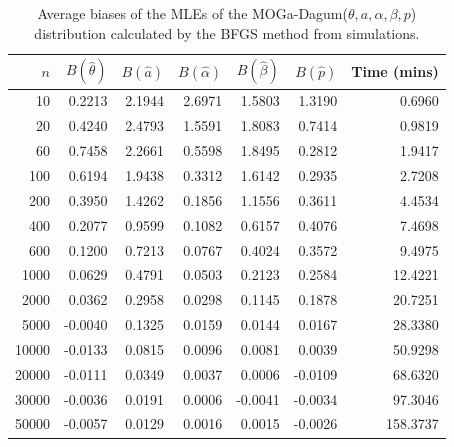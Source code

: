 \documentclass[twoside,leqno,11pt]{article}
\begin{document}
\begin{table}[H]
\centering
\caption{Average biases of the MLEs of the MOGa-Dagum($\theta, a, \alpha, \beta, p$) distri\-bu\-tion 
calculated by the BFGS method from simulations.}\label{tab:bias1}
	\begin{tabular}{rrrrrrr}
		\hline
		$n$ & $B(\hat{\theta})$ & $B(\hat{a})$ & $B(\hat{\alpha})$ & $B(\hat{\beta})$ & $B(\hat{p})$ & Time (mins)\\
		\hline
10 & 0.2213 & 2.1944 & 2.6971 & 1.5803 & 1.3190 & 0.6960 \\ 
20 & 0.4240 & 2.4793 & 1.5591 & 1.8083 & 0.7414 & 0.9819 \\ 
60 & 0.7458 & 2.2661 & 0.5598 & 1.8495 & 0.2812 & 1.9417 \\ 
100 & 0.6194 & 1.9438 & 0.3312 & 1.6142 & 0.2935 & 2.7208 \\ 
200 & 0.3950 & 1.4262 & 0.1856 & 1.1556 & 0.3611 & 4.4534 \\ 
400 & 0.2077 & 0.9599 & 0.1082 & 0.6157 & 0.4076 & 7.4698 \\ 
600 & 0.1200 & 0.7213 & 0.0767 & 0.4024 & 0.3572 & 9.4975 \\ 
1000 & 0.0629 & 0.4791 & 0.0503 & 0.2123 & 0.2584 & 12.4221 \\ 
2000 & 0.0362 & 0.2958 & 0.0298 & 0.1145 & 0.1878 & 20.7251 \\ 
5000 & -0.0040 & 0.1325 & 0.0159 & 0.0144 & 0.0167 & 28.3380 \\ 
10000 & -0.0133 & 0.0815 & 0.0096 & 0.0081 & 0.0039 & 50.9298 \\ 
20000 & -0.0111 & 0.0349 & 0.0037 & 0.0006 & -0.0109 & 68.6320 \\ 
30000 & -0.0036 & 0.0191 & 0.0006 & -0.0041 & -0.0034 & 97.3046 \\ 
50000 & -0.0057 & 0.0129 & 0.0016 & 0.0015 & -0.0026 & 158.3737 \\ 
		\hline
	\end{tabular}
\end{table}
\end{document}
